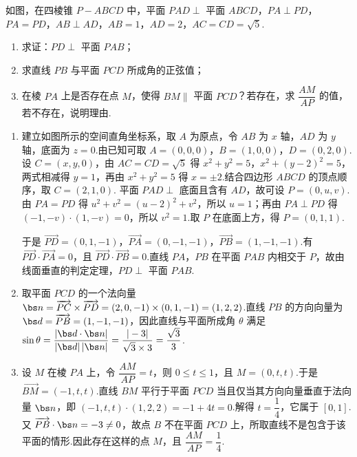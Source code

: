 \begin{problem}
如图，在四棱锥 \(P-ABCD\) 中，平面 \(PAD\perp\) 平面 \(ABCD\)，\(PA\perp PD\)，\(PA=PD\)，\(AB\perp AD\)，\(AB=1\)，\(AD=2\)，\(AC=CD=\sqrt5\).

\begin{enumerate}
\item 求证：\(PD\perp\) 平面 \(PAB\)；
\item 求直线 \(PB\) 与平面 \(PCD\) 所成角的正弦值；
\item 在棱 \(PA\) 上是否存在点 \(M\)，使得 \(BM\parallel\) 平面 \(PCD\)？若存在，求 \(\dfrac{AM}{AP}\) 的值，若不存在，说明理由.
\end{enumerate}

\begingroup
{}
\endgroup
\end{problem}

\begin{solution}
\begin{enumerate}
\item 建立如图所示的空间直角坐标系，取 \(A\) 为原点，令 \(AB\) 为 \(x\) 轴，\(AD\) 为 \(y\) 轴，底面为 \(z=0\).由已知可取
\(A=(0,0,0)\)，\(B=(1,0,0)\)，\(D=(0,2,0)\).设 \(C=(x,y,0)\)，由 \(AC=CD=\sqrt5\) 得 \(x^2+y^2=5\)，\(x^2+(y-2)^2=5\)，两式相减得 \(y=1\)，再由 \(x^2+y^2=5\) 得 \(x=\pm2\).结合四边形 \(ABCD\) 的顶点顺序，取 \(C=(2,1,0)\).
平面 \(PAD\perp\) 底面且含有 \(AD\)，故可设 \(P=(0,u,v)\).由 \(PA=PD\) 得 \(u^2+v^2=(u-2)^2+v^2\)，所以 \(u=1\)；再由 \(PA\perp PD\) 得 \((-1,-v)\cdot(1,-v)=0\)，所以 \(v^2=1\).取 \(P\) 在底面上方，得 \(P=(0,1,1)\).

于是 \(\overrightarrow{PD}=(0,1,-1)\)，\(\overrightarrow{PA}=(0,-1,-1)\)，\(\overrightarrow{PB}=(1,-1,-1)\).有 \(\overrightarrow{PD}\cdot\overrightarrow{PA}=0\)，且 \(\overrightarrow{PD}\cdot\overrightarrow{PB}=0\).直线 \(PA\)，\(PB\) 在平面 \(PAB\) 内相交于 \(P\)，故由线面垂直的判定定理，\(PD\perp\) 平面 \(PAB\).
\item 取平面 \(PCD\) 的一个法向量
\(\bs n=\overrightarrow{PC}\times\overrightarrow{PD}=(2,0,-1)\times(0,1,-1)=(1,2,2)\).直线 \(PB\) 的方向向量为 \(\bs d=\overrightarrow{PB}=(1,-1,-1)\)，因此直线与平面所成角 \(\theta\) 满足
\(\sin\theta=\dfrac{|\bs d\cdot\bs n|}{|\bs d|\,|\bs n|}=\dfrac{|-3|}{\sqrt3\times3}=\dfrac{\sqrt3}{3}\).
\item 设 \(M\) 在棱 \(PA\) 上，令 \(\dfrac{AM}{AP}=t\)，则 \(0\le t\le1\)，且 \(M=(0,t,t)\).于是 \(\overrightarrow{BM}=(-1,t,t)\).直线 \(BM\) 平行于平面 \(PCD\) 当且仅当其方向向量垂直于法向量 \(\bs n\)，即
\((-1,t,t)\cdot(1,2,2)=-1+4t=0\).解得 \(t=\dfrac14\)，它属于 \([0,1]\).又 \(\overrightarrow{PB}\cdot\bs n=-3\ne0\)，故点 \(B\) 不在平面 \(PCD\) 上，所取直线不是包含于该平面的情形.因此存在这样的点 \(M\)，且 \(\dfrac{AM}{AP}=\dfrac14\).
\end{enumerate}
\end{solution}

